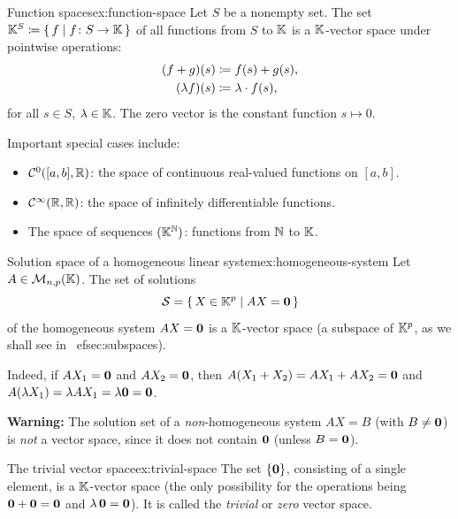 \begin{example}{Function spaces}{ex:function-space}
Let $S$ be a nonempty set. The set ${\mathbb{K}}^S \coloneqq \left\{\,f\;\middle|\;f\colon S\to{\mathbb{K}}\,\right\}$
of all functions from $S$ to ${\mathbb{K}}$ is a ${\mathbb{K}}$-vector space under pointwise
operations:
\begin{align*}
  (f+g)(s) &\coloneqq f(s) + g(s), \\
  (\lambda f)(s) &\coloneqq \lambda\cdot f(s),
\end{align*}
for all $s\in S$, $\lambda\in{\mathbb{K}}$. The zero vector is the constant
function $s\mapsto 0$.

Important special cases include:
\begin{itemize}
  \item ${\mathcal{C}}^0([a,b],{\mathbb{R}})$: the space of continuous real-valued functions
    on $[a,b]$.
  \item ${\mathcal{C}}^\infty({\mathbb{R}},{\mathbb{R}})$: the space of infinitely differentiable
    functions.
  \item The space of sequences $({\mathbb{K}}^{\mathbb{N}})$: functions from ${\mathbb{N}}$ to ${\mathbb{K}}$.
\end{itemize}
\end{example}

\begin{example}{Solution space of a homogeneous linear system}{ex:homogeneous-system}
Let $A\in\mathcal{M}_{n,p}({\mathbb{K}})$. The set of solutions
\[
  {\mathcal{S}} = \left\{\,X\in{\mathbb{K}}^p\;\middle|\;AX = \mathbf{0}\,\right\}
\]
of the homogeneous system $AX = \mathbf{0}$ is a ${\mathbb{K}}$-vector space (a
subspace of ${\mathbb{K}}^p$, as we shall see in~
ef{sec:subspaces}).

Indeed, if $AX_1 = \mathbf{0}$ and $AX_2 = \mathbf{0}$, then
$A(X_1+X_2) = AX_1 + AX_2 = \mathbf{0}$ and
$A(\lambda X_1) = \lambda AX_1 = \lambda\mathbf{0} = \mathbf{0}$.

\textbf{Warning:} The solution set of a \emph{non}-homogeneous system
$AX = B$ (with $B\neq\mathbf{0}$) is \emph{not} a vector space, since it
does not contain $\mathbf{0}$ (unless $B=\mathbf{0}$).
\end{example}

\begin{example}{The trivial vector space}{ex:trivial-space}
The set $\left\{\mathbf{0}\right\}$, consisting of a single element, is a
${\mathbb{K}}$-vector space (the only possibility for the operations being
$\mathbf{0}+\mathbf{0} = \mathbf{0}$ and $\lambda\,\mathbf{0} = \mathbf{0}$). It is called
the \emph{trivial} or \emph{zero} vector space.
\end{example}

